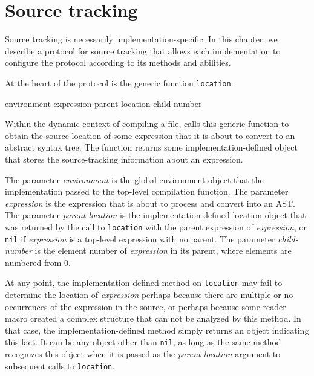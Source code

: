 \chapter{Source tracking}

Source tracking is necessarily implementation-specific.  In this
chapter, we describe a protocol for source tracking that allows each
implementation to configure the protocol according to its methods and
abilities. 

At the heart of the protocol is the generic function \texttt{location}:

            {environment expression parent-location child-number}

Within the dynamic context of compiling a file, \sysname{} calls this
generic function to obtain the source location of some expression that
it is about to convert to an abstract syntax tree.  The function
returns some implementation-defined object that stores the
source-tracking information about an expression.  

The parameter \textit{environment} is the global environment object
that the implementation passed to the top-level compilation function. 
The parameter \textit{expression} is the expression that \sysname{} is
about to process and convert into an AST.  The parameter
\textit{parent-location} is the implementation-defined location object
that was returned by the call to \texttt{location} with the parent
expression of \textit{expression}, or \texttt{nil} if
\textit{expression} is a top-level expression with no parent.  The
parameter \textit{child-number} is the element number of
\textit{expression} in its parent, where elements are numbered from
$0$. 

At any point, the implementation-defined method on \texttt{location}
may fail to determine the location of \textit{expression} perhaps
because there are multiple or no occurrences of the expression in the
source, or perhaps because some reader macro created a complex
structure that can not be analyzed by this method.  In that case, the
implementation-defined method simply returns an object indicating this
fact.  It can be any object other than \texttt{nil}, as long as the
same method recognizes this object when it is passed as the
\textit{parent-location} argument to subsequent calls to
\texttt{location}. 
